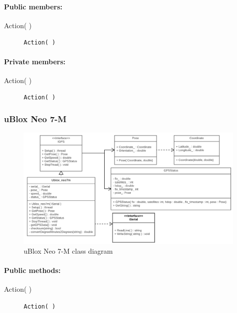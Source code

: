 \paragraph{Public members:}
\begin{adjustwidth}{2.5em}{0pt}\begin{description}
		\item [Action( )] \texttt{Action( )} 
\end{description}\end{adjustwidth}

\paragraph{Private members:}
\begin{adjustwidth}{2.5em}{0pt}\begin{description}
		\item [Action( )] \texttt{Action( )}
\end{description}\end{adjustwidth}

\subsubsection{uBlox Neo 7-M}

\begin{figure}[H]
\centering
\includegraphics[width=1\linewidth]{Images/Design/ubloxNEO7M_class_diagram}
\caption{uBlox Neo 7-M class diagram}
\label{fig:ubloxneo7m}
\end{figure}

\paragraph{Public methods:}
\begin{adjustwidth}{2.5em}{0pt}\begin{description}
		\item [Action( )] \texttt{Action( )}
\end{description}\end{adjustwidth}

